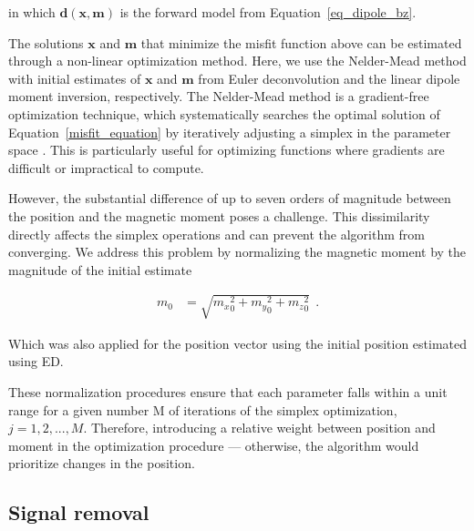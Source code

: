 \documentclass[onecolumn,12pt,a4paper]{article}
\begin{document}
    \noindent
    in which $\mathbf{d}(\mathbf{x}, \mathbf{m})$ is the forward model from Equation~\ref{eq_dipole_bz}. 

    The solutions $\mathbf{x}$  and $\mathbf{m}$ that minimize the misfit function above can be estimated through a non-linear optimization method. 
    Here, we use the Nelder-Mead method \citep{Nelder-Mead1965,Gao2010} with initial estimates of $\mathbf{x}$ and $\mathbf{m}$ from Euler deconvolution and the linear dipole moment inversion, respectively.    
     The Nelder-Mead method is a gradient-free optimization technique, which systematically searches the optimal solution of Equation~\ref{misfit_equation} by iteratively adjusting a simplex in the parameter space \citep{Nelder-Mead1965}. This is particularly useful for optimizing functions where gradients are difficult or impractical to compute. 

     However, the substantial difference of up to seven orders of magnitude between the position and the magnetic moment poses a challenge. This dissimilarity directly affects the simplex operations and can prevent the algorithm from converging. We address this problem by normalizing the magnetic moment by the magnitude of the initial estimate

    \begin{align}
    \label{normalizing_m_parameters}
    m_0 &= \sqrt{{m_x}_0^2+{m_y}_0^2+{m_z}_0^2}\ %
    \ .
    \end{align}

\noindent
Which was also applied for the position vector using the initial position estimated using ED. %


\noindent
These normalization procedures ensure that each parameter falls within a unit range for a given number M of iterations of the simplex optimization, $j = 1,2,..., M$. Therefore, introducing a relative weight between position and moment in the optimization procedure — otherwise, the algorithm would prioritize changes in the position.


\subsection{Signal removal}
\label{sec:signal_removal}
\end{document}
